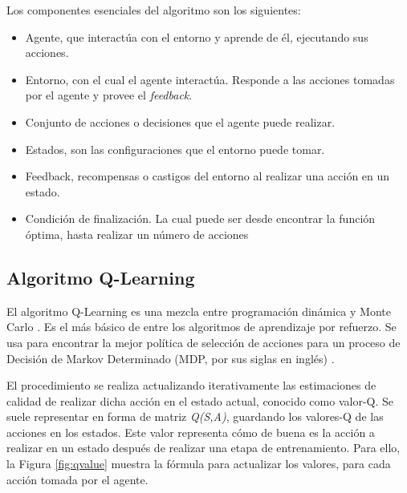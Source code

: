 	\begin{flushleft}
		Los componentes esenciales del algoritmo son los siguientes:
	\end{flushleft}
	\begin{itemize}
		\item Agente, que interactúa con el entorno y aprende de él, ejecutando sus acciones. 
		\item Entorno, con el cual el agente interactúa. Responde a las acciones tomadas por el agente y provee el \textit{feedback}.
		\item Conjunto de acciones o decisiones que el agente puede realizar.
		\item Estados, son las configuraciones que el entorno puede tomar.
		\item Feedback, recompensas o castigos del entorno al realizar una acción en un estado.		
		\item Condición de finalización. La cual puede ser desde encontrar la función óptima, hasta realizar un número de acciones 
	\end{itemize}


	\subsection{Algoritmo Q-Learning} 
		El algoritmo Q-Learning es una mezcla entre programación dinámica y Monte Carlo \cite{wang2012monte}. Es el más básico de entre los algoritmos de aprendizaje por refuerzo. Se usa para encontrar la mejor política de selección de acciones para un proceso de Decisión de Markov Determinado (MDP, por sus siglas en inglés) \cite{garcia2013markov}. 
		
		El procedimiento se realiza actualizando iterativamente las estimaciones de calidad de realizar dicha acción en el estado actual, conocido como valor-Q. Se suele representar en forma de matriz \textit{Q(S,A)}, guardando los valores-Q de las acciones en los estados. Este valor representa cómo de buena es la acción a realizar en un estado después de realizar una etapa de entrenamiento. Para ello, la Figura \ref{fig:qvalue} muestra la fórmula para actualizar los valores, para cada acción tomada por el agente.
				
